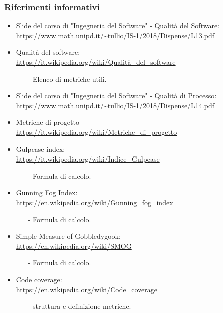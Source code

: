\subsubsection{Riferimenti informativi}
 \begin{itemize}
 	\item Slide del corso di "Ingegneria del Software" - Qualità del Software: \\
		\url{https://www.math.unipd.it/~tullio/IS-1/2018/Dispense/L13.pdf} 
	\item Qualità del software: \\
		\url{https://it.wikipedia.org/wiki/Qualità_del_software}
		\begin{itemize}
			\item[-] Elenco di metriche utili.
		\end{itemize} 
	\item  Slide del corso di "Ingegneria del Software" - Qualità di Processo: \\
		\url{https://www.math.unipd.it/~tullio/IS-1/2018/Dispense/L14.pdf}
	\item Metriche di progetto \\
 		\url{https://it.wikipedia.org/wiki/Metriche_di_progetto}
 	\item Gulpease index: \\
 		\url{https://it.wikipedia.org/wiki/Indice_Gulpease}
 	\begin{itemize}
 		\item[-] Formula di calcolo.
	\end{itemize}
	\item Gunning Fog Index: \\
		\url{https://en.wikipedia.org/wiki/Gunning_fog_index}
		\begin{itemize}
		\item[-] Formula di calcolo.
		\end{itemize}
	\item Simple Measure of Gobbledygook: \\ 
		 \url{https://en.wikipedia.org/wiki/SMOG}
		 \begin{itemize}
		 	\item[-] Formula di calcolo.
		 \end{itemize} \clearpage
	\item Code coverage: \\ 
		\url{https://en.wikipedia.org/wiki/Code_coverage}
		\begin{itemize}
		\item[-] struttura e definizione metriche.
		\end{itemize}
\end{itemize}
